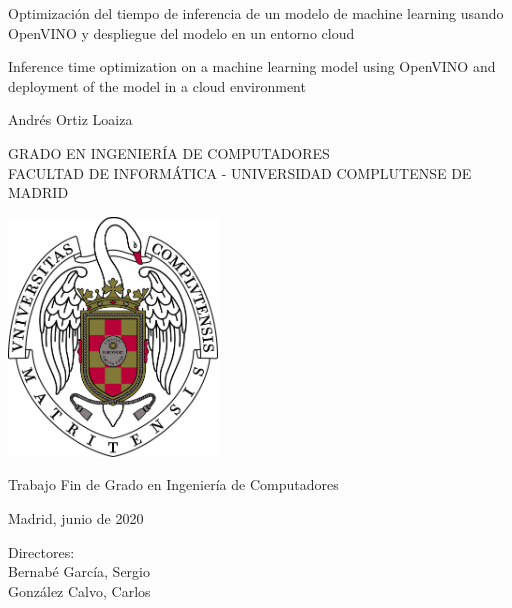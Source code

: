 \newpage


\thispagestyle{empty}


\begin{center}


    {\Huge Optimización del tiempo de inferencia de un modelo de machine learning usando OpenVINO y despliegue del modelo en un entorno cloud}\\

    \vspace{0.5cm}

    {\scriptize Inference time optimization on a machine learning model using OpenVINO and deployment of the model in a cloud environment}\\


    \vspace{1cm}

    {\large Andrés Ortiz Loaiza}\\

    \vspace{1cm}

    GRADO EN INGENIERÍA DE COMPUTADORES\\ FACULTAD DE INFORMÁTICA -
    UNIVERSIDAD COMPLUTENSE DE MADRID \\



    \vspace{1cm}

    \includegraphics[height=2.5in]{images/ucm/shield2.jpg}

    \vspace{0.5cm}
    Trabajo Fin de Grado en Ingeniería de Computadores

    \vspace{0.5cm}

   Madrid, junio de 2020\\
    \vspace{2cm}

\end{center}

{\raggedleft
    Directores:\\
    \vspace{ 0.5cm}
    Bernabé García, Sergio\\
    González Calvo, Carlos\\
}